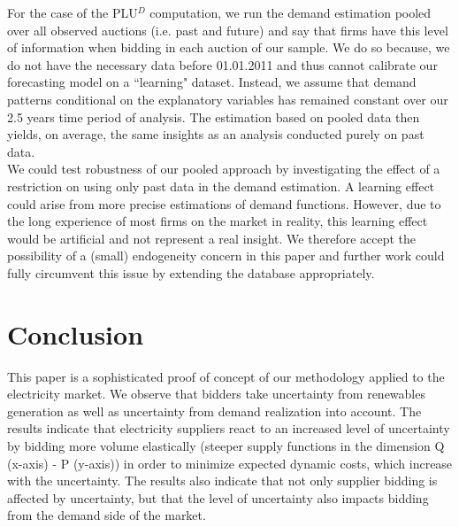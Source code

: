For the case of the PLU$^D$ computation,  we run the demand estimation pooled over all observed auctions (i.e. past and future) and say that firms have this level of information when bidding in each auction of our sample. We do so because, we do not have the necessary data before 01.01.2011 and thus cannot calibrate our forecasting model on a ``learning" dataset. Instead, we assume that demand patterns conditional on the explanatory variables has remained constant over our 2.5 years time period of analysis. 
The estimation based on pooled data then yields, on average, the same insights as an analysis conducted purely on past data. \\


We could test robustness of our pooled approach by investigating the effect of a restriction on using only past data in the demand estimation. A learning effect could arise from more precise estimations of demand functions. However, due to the long experience of most firms on the market in reality, this learning effect would be artificial and not represent a real insight. We therefore accept the possibility of a (small) endogeneity concern in this paper and further work could fully circumvent this issue by extending the database appropriately. \\


\section{Conclusion}
\label{conclusion}
This paper is a sophisticated proof of concept of our methodology applied to the electricity market. We observe that bidders take uncertainty from renewables generation as well as uncertainty from demand realization into account. The results indicate that electricity suppliers react to an increased level of uncertainty by bidding more volume elastically (steeper supply functions in the dimension Q (x-axis) - P (y-axis)) in order to minimize expected dynamic costs, which increase with the uncertainty. The results also indicate that not only supplier bidding is affected by uncertainty, but that the level of uncertainty also impacts bidding from the demand side of the market.\\ 


